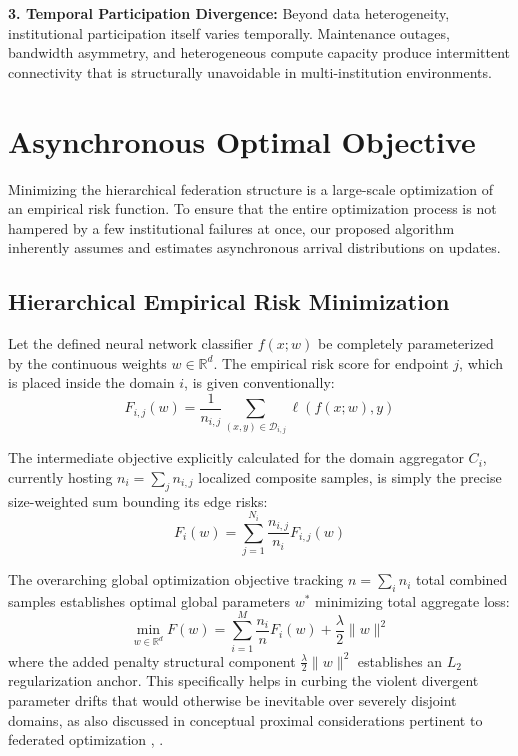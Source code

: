 \documentclass[conference]{IEEEtran}
\begin{document}
\textbf{3. Temporal Participation Divergence:} Beyond data heterogeneity, institutional participation itself varies temporally. Maintenance outages, bandwidth asymmetry, and heterogeneous compute capacity produce intermittent connectivity that is structurally unavoidable in multi-institution environments.

\section{Asynchronous Optimal Objective}

Minimizing the hierarchical federation structure is a large-scale optimization of an empirical risk function. To ensure that the entire optimization process is not hampered by a few institutional failures at once, our proposed algorithm inherently assumes and estimates asynchronous arrival distributions on updates.

\subsection{Hierarchical Empirical Risk Minimization}
Let the defined neural network classifier $f(x;w)$ be completely parameterized by the continuous weights $w \in \mathbb{R}^d$. The empirical risk score for endpoint $j$, which is placed inside the domain $i$, is given conventionally:
\begin{equation}
F_{i,j}(w) = \frac{1}{n_{i,j}} \sum_{(x,y) \in \mathcal{D}_{i,j}} \ell(f(x; w), y)
\end{equation}

The intermediate objective explicitly calculated for the domain aggregator $C_i$, currently hosting $n_i = \sum_j n_{i,j}$ localized composite samples, is simply the precise size-weighted sum bounding its edge risks:
\begin{equation}
F_i(w) = \sum_{j=1}^{N_i} \frac{n_{i,j}}{n_i} F_{i,j}(w)
\end{equation}

The overarching global optimization objective tracking $n = \sum_i n_i$ total combined samples establishes optimal global parameters $w^*$ minimizing total aggregate loss:
\begin{equation}
\min_{w \in \mathbb{R}^d} F(w) = \sum_{i=1}^{M} \frac{n_i}{n} F_i(w) + \frac{\lambda}{2}\|w\|^2
\end{equation}
where the added penalty structural component $\frac{\lambda}{2}\|w\|^2$ establishes an $L_2$ regularization anchor. This specifically helps in curbing the violent divergent parameter drifts that would otherwise be inevitable over severely disjoint domains, as also discussed in conceptual proximal considerations pertinent to federated optimization \cite{b15}, \cite{b32}.
\end{document}
